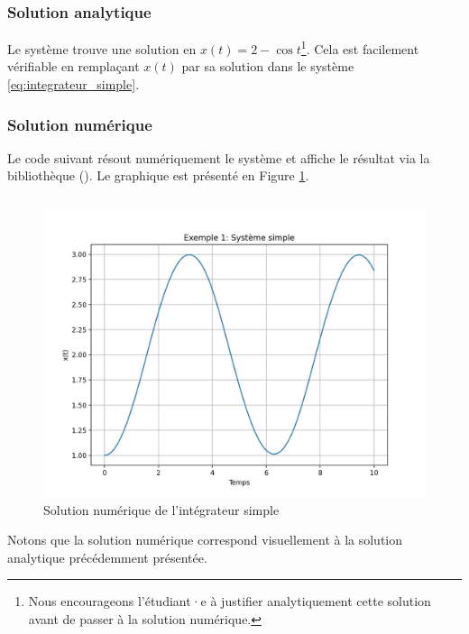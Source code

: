             \subsubsection{Solution analytique}
                Le système trouve une solution en $x(t) = 2 - \cos t$\footnote{Nous encourageons l'étudiant·e à justifier analytiquement cette solution avant de passer à la solution numérique.}. Cela est facilement vérifiable en remplaçant $x(t)$ par sa solution dans le système \ref{eq:integrateur_simple}.

            \subsubsection{Solution numérique}
                Le code suivant résout numériquement le système et affiche le résultat via la bibliothèque  (\cite{Matplotlib2007}). Le graphique est présenté en Figure \ref{fig:integrateur_simple}. 
                \inputminted{python}{codes/integrateur_simple.py}
                \begin{figure}[ht!]
                    \centering
                    \includegraphics[width=\textwidth]{images/integrateur_simple.jpg}
                    \caption{Solution numérique de l'intégrateur simple}
                    \label{fig:integrateur_simple}
                \end{figure}
                Notons que la solution numérique correspond visuellement à la solution analytique précédemment présentée.

